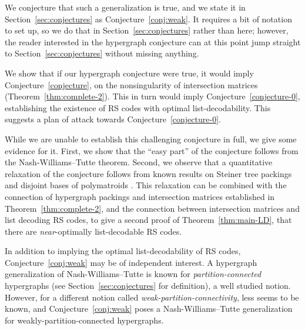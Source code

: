 \documentclass[11pt]{article}
\newcommand{\ryl}[1]{{\color{red} {\small [Ray: #1]}}}
\begin{document}
We conjecture that such a generalization is true, and we state it in Section~\ref{sec:conjectures} as Conjecture~\ref{conj:weak}. It requires a bit of notation to set up, so we do that in Section~\ref{sec:conjectures} rather than here; however, the reader interested in the hypergraph conjecture can at this point jump straight to Section~\ref{sec:conjectures} without missing anything.

We show that if our hypergraph conjecture were true, it would imply Conjecture~\ref{conjecture}, on the nonsingularity of intersection matrices (Theorem~\ref{thm:complete-2}).  This in turn would imply
Conjecture~\ref{conjecture-0}, establishing the existence of RS codes with optimal list-decodability.  This suggests a plan of attack towards Conjecture~\ref{conjecture-0}.

While we are unable to establish this challenging conjecture in full, we give some evidence for it.
First, we show that the ``easy part'' of the conjecture follows from the Nash-Williams--Tutte theorem.
Second, we observe that a quantitative relaxation of the conjecture follows from known results on Steiner tree packings \cite{CS07} and disjoint bases of polymatroids \cite{CCV09}.
This relaxation can be combined with the connection of hypergraph packings and intersection matrices established in Theorem~\ref{thm:complete-2}, and the connection between intersection matrices and list decoding RS codes, to give a second proof of Theorem~\ref{thm:main-LD}, that there are \emph{near}-optimally list-decodable RS codes.

In addition to implying the optimal list-decodability of RS codes, Conjecture~\ref{conj:weak} may be of independent interest.
A hypergraph generalization of Nash-Williams--Tutte is known for \emph{partition-connected} hypergraphs \cite{frank2003decomposing} (see Section~\ref{sec:conjectures} for definition), a well studied notion.
However, for a different notion called \emph{weak-partition-connectivity}, less seems to be known, and Conjecture~\ref{conj:weak} poses a Nash-Williams--Tutte generalization for weakly-partition-connected hypergraphs.

\end{document}
